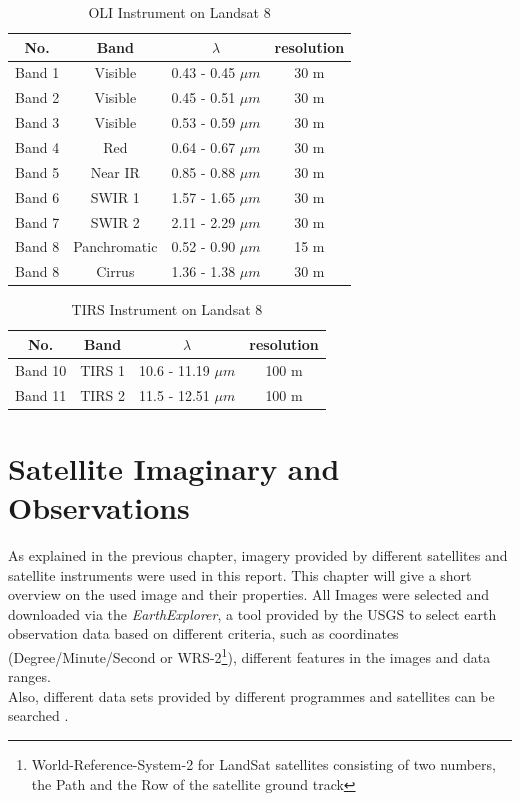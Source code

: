 \begin{table}[h!]
	\centering
	\begin{tabular}{ | c | c | c | c |}
	\hline
	\textbf{No.} & \textbf{Band} & \textbf{$\lambda$} & \textbf{resolution} \\
	\hline
	Band 1 & Visible & 0.43 - 0.45 $\mu m$ & {30 m} \\
	Band 2 & Visible & 0.45 - 0.51 $\mu m$ & {30 m} \\
	Band 3 & Visible & 0.53 - 0.59 $\mu m$ & {30 m} \\
	Band 4 & Red & 0.64 - 0.67 $\mu m$ & {30 m} \\
	Band 5 & Near IR & 0.85 - 0.88 $\mu m$ & {30 m} \\
	Band 6 & SWIR 1 & 1.57 - 1.65  $\mu m$ & {30 m} \\
	Band 7 & SWIR 2 & 2.11 - 2.29 $\mu m$ & {30 m} \\
	Band 8 & Panchromatic & 0.52 - 0.90 $\mu m$ & {15 m} \\
	Band 8 & Cirrus & 1.36 - 1.38 $\mu m$ & {30 m} \\
	\hline
	\end{tabular}
	\caption{OLI Instrument on Landsat 8 \citep{l8:usgs}}
	\label{tab:L8OLI}
\end{table}

\begin{table}[h!]
	\centering
	\begin{tabular}{ | c | c | c | c |}
	\hline
	\textbf{No.} & \textbf{Band} & \textbf{$\lambda$} & \textbf{resolution} \\
	\hline
	Band 10 & TIRS 1 & 10.6 - 11.19 $\mu m$ & {100 m} \\
	Band 11 & TIRS 2 & 11.5 - 12.51 $\mu m$ & {100 m} \\
	\hline
	\end{tabular}
	\caption{TIRS Instrument on Landsat 8 \citep{l8:usgs}}
	\label{tab:L8TIRS}
\end{table}


\section{Satellite Imaginary and Observations}
As explained in the previous chapter, imagery provided by different satellites and satellite instruments were used in this report. This chapter will give a short overview on the used image and their properties. All Images were selected and downloaded via the \textit{EarthExplorer}, a tool provided by the USGS to select earth observation data based on different criteria, such as coordinates (Degree/Minute/Second or WRS-2\footnote{World-Reference-System-2 for LandSat satellites consisting of two numbers, the Path and the Row of the satellite ground track}), different features in the images and data ranges.\\
Also, different data sets provided by different programmes and satellites can be searched \citep{earthexpl}.\\

